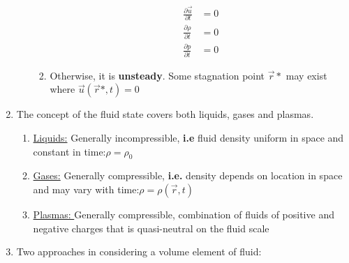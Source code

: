 \documentclass[11pt]{article}
\begin{document}
\begin{enumerate}
\begin{enumerate}
\begin{enumerate}
\begin{subequations}
                                                                                                    \label{eq:equation}
                                                                                                    \begin{align*}
                                                                                                        \frac{\partial \vec{u}}{\partial t} &= 0\\
                                                                                                        \frac{\partial \rho}{\partial t} &= 0\\
                                                                                                        \frac{\partial p}{\partial t} &= 0
                                                                                                    \end{align*}
                                                                                                \end{subequations}
                                                                                       \item Otherwise, it is \textbf{unsteady}.
                                                                                       Some stagnation point $\vec{r}*$ may exist where $\vec{u}(\vec{r}*,t) = 0$
                                                                                   \end{enumerate}
                \end{enumerate}
                \item The concept of the fluid state covers both liquids, gases and plasmas.
                        \begin{enumerate}
                            \item \underline{Liquids:} Generally incompressible, \textbf{i.e} fluid density uniform in space and constant in time:$\rho = \rho_0$
                            \item \underline{Gases:} Generally compressible, \textbf{i.e.} density depends on location in space and may vary with time:$\rho = \rho(\vec{r},t)$
                            \item \underline{Plasmas: } Generally compressible, combination of fluids of positive and negative charges that is quasi-neutral on the fluid scale
                        \end{enumerate}
                \item Two approaches in considering a volume element of fluid:

\end{enumerate}
\end{document}
